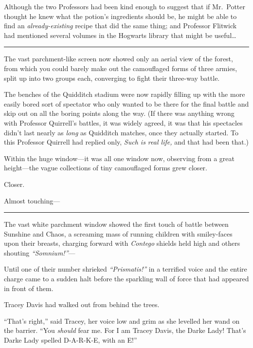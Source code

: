 Although the two Professors had been kind enough to suggest that if
Mr.~Potter thought he knew what the potion's ingredients should be, he
might be able to find an \emph{already-existing} recipe that did the
same thing; and Professor Flitwick had mentioned several volumes in the
Hogwarts library that might be useful\ldots{}

\begin{center}\rule{3in}{0.4pt}\end{center}

The vast parchment-like screen now showed only an aerial view of the
forest, from which you could barely make out the camouflaged forms of
three armies, split up into two groups each, converging to fight their
three-way battle.

The benches of the Quidditch stadium were now rapidly filling up with
the more easily bored sort of spectator who only wanted to be there for
the final battle and skip out on all the boring points along the way.
(If there was anything wrong with Professor Quirrell's battles, it was
widely agreed, it was that his spectacles didn't last nearly as
\emph{long} as Quidditch matches, once they actually started. To this
Professor Quirrell had replied only, \emph{Such is real life,} and that
had been that.)

Within the huge window---it was all one window now, observing from a
great height---the vague collections of tiny camouflaged forms grew
closer.

Closer.

Almost touching---

\begin{center}\rule{3in}{0.4pt}\end{center}

The vast white parchment window showed the first touch of battle between
Sunshine and Chaos, a screaming mass of running children with
smiley-faces upon their breasts, charging forward with \emph{Contego}
shields held high and others shouting \emph{``Somnium!''}---

Until one of their number shrieked \emph{``Prismatis!''} in a terrified
voice and the entire charge came to a sudden halt before the sparkling
wall of force that had appeared in front of them.

Tracey Davis had walked out from behind the trees.

``That's right,'' said Tracey, her voice low and grim as she levelled
her wand on the barrier. ``You \emph{should} fear me. For I am Tracey
Davis, the Darke Lady! That's Darke Lady spelled D-A-R-K-E, with an E!''

